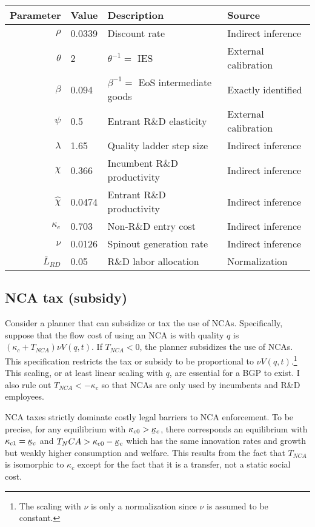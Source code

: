 \documentclass[11pt,english]{article}
\newcommand\munderbar[1]{%
	\underaccent{\bar}{#1}}
\theoremstyle{remark}
\begin{document}
\begin{table}[]
	\centering
	\label{calibration_lowEntry_parameters}
	\begin{tabular}{rlll}
		\toprule \toprule
		Parameter & Value & Description & Source \tabularnewline
		\midrule
		$\rho$ & 0.0339 & Discount rate  & Indirect inference \tabularnewline
		$\theta$ & 2 & $\theta^{-1} = $ IES & External calibration 
		\tabularnewline
		$\beta$ & 0.094 & $\beta^{-1} = $ EoS intermediate goods & Exactly identified \tabularnewline 
		$\psi$ & 0.5 & Entrant R\&D elasticity & External calibration \tabularnewline
		$\lambda$ & 1.65 & Quality ladder step size & Indirect inference 
		\tabularnewline
		$\chi$ & 0.366 & Incumbent R\&D productivity & Indirect inference 
		\tabularnewline
		$\hat{\chi}$ & 0.0474 & Entrant R\&D productivity & Indirect inference \tabularnewline 
		$\kappa_e$ & 0.703 & Non-R\&D entry cost & Indirect inference \tabularnewline
		$\nu$ & 0.0126 & Spinout generation rate  & Indirect inference\tabularnewline
		$\bar{L}_{RD}$ & 0.05 & R\&D labor allocation  & Normalization \tabularnewline
		\bottomrule
	\end{tabular}
\end{table}

\subsection{NCA tax (subsidy)}

Consider a planner that can subsidize or tax the use of NCAs. Specifically, suppose that the flow cost of using an NCA is with quality $q$ is $(\kappa_c + T_{NCA})\nu  V(q,t)$. If $T_{NCA} < 0$, the planner subsidizes the use of NCAs. This specification restricts the tax or subsidy to be proportional to $\nu V(q,t)$.\footnote{The scaling with $\nu$ is only a normalization since $\nu$ is assumed to be constant.} This scaling, or at least linear scaling with $q$, are essential for a BGP to exist. I also rule out $T_{NCA} < -\kappa_c$ so that NCAs are only used by incumbents and R\&D employees.

NCA taxes strictly dominate costly legal barriers to NCA enforcement. To be precise, for any equilibrium with $\kappa_{c0} > \munderbar{\kappa}_c$, there corresponds an equilibrium with $\kappa_{c1} = \munderbar{\kappa}_c$ and $T_NCA > \kappa_{c0} - \munderbar{\kappa}_c$ which has the same innovation rates and growth but weakly higher consumption and welfare. This results from the fact that $T_{NCA}$ is isomorphic to $\kappa_c$ except for the fact that it is a transfer, not a static social cost. 
\end{document}
